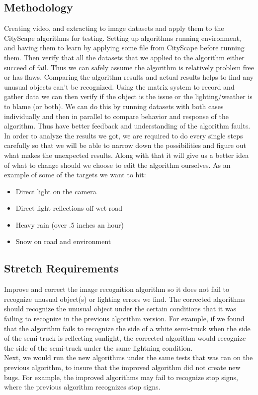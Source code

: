 \documentclass[10pt,draftclsnofoot,onecolumn,journal,compsoc]{IEEEtran}
\begin{document}
	\subsection{Methodology}
    Creating video, and extracting to image datasets and apply them to the CityScape algorithms for testing.
    Setting up algorithms running environment, and having them to learn by applying some file from CityScape before running them.
    Then verify that all the datasets that we applied to the algorithm either succeed of fail.
    Thus we can safely assume the algorithm is relatively problem free or has flaws.
    Comparing the algorithm results and actual results helps to find any unusual objects can't be recognized.
    Using the matrix system to record and gather data we can then verify if the object is the issue or the lighting/weather is to blame (or both).
    We can do this by running datasets with both cases individually and then in parallel to compare behavior and response of the algorithm.
    Thus have better feedback and understanding of the algorithm faults.
    In order to analyze the results we got, we are required to do every single steps carefully so that we will be able to narrow down the possibilities and figure out what makes the unexpected results. 
    Along with that it will give us a better idea of what to change should we choose to edit the algorithm ourselves.
    \newline
    As an example of some of the targets we want to hit:
	\begin{itemize}
 		 \item Direct light on the camera
 		 \item Direct light reflections off wet road
         \item Heavy rain (over .5 inches an hour)
         \item Snow on road and environment
	\end{itemize}
    
    \subsection{Stretch Requirements}

    Improve and correct the image recognition algorithm so it does not fail to recognize unusual object(s) or lighting errors we find. 
    The corrected algorithms should recognize the unusual object under the certain conditions that it was failing to recognize in the previous algorithm version.
    For example, if we found that the algorithm fails to recognize the side of a white semi-truck when the side of the semi-truck is reflecting sunlight, the corrected algorithm would recognize the side of the semi-truck under the same lightning condition.\\
    Next, we would run the new algorithms under the same tests that was ran on the previous algorithm, to insure that the improved algorithm did not create new bugs. 
    For example, the improved algorithms may fail to recognize stop signs, where the previous algorithm recognizes stop signs.
 
\end{document}
